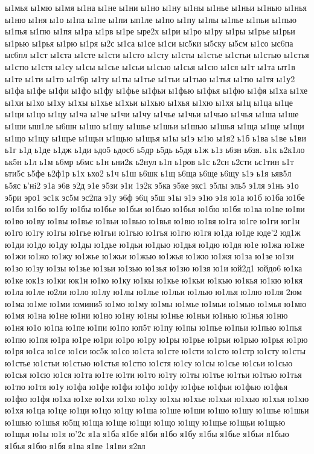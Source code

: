 {{ы1мья
ы1мю
ы1мя
ы1на
ы1не
ы1ни
ы1но
ы1ну
ы1ны
ы1нье
ы1ньи
ы1нью
ы1нья
ы1ню
ы1ня
ы1о
ы1па
ы1пе
ы1пи
ып1ле
ы1по
ы1пу
ы1пы
ы1пье
ы1пьи
ы1пью
ы1пья
ы1пю
ы1пя
ы1ра
ы1рв
ы1ре
ыре2х
ы1ри
ы1ро
ы1ру
ы1ры
ы1рье
ы1рьи
ы1рью
ы1рья
ы1рю
ы1ря
ы2с
ы1са
ы1се
ы1си
ыс5ки
ы5ску
ы5см
ы1со
ыс6па
ыс6пл
ы1ст
ы1ста
ы1сте
ы1сти
ы1сто
ы1сту
ы1сты
ы1стье
ы1стьи
ы1стью
ы1стья
ы1стю
ы1стя
ы1су
ы1сы
ы1сье
ы1сьи
ы1сью
ы1сья
ы1сю
ы1ся
ы1т
ы1та
ыт1в
ы1те
ы1ти
ы1то
ы1т6р
ы1ту
ы1ты
ы1тье
ы1тьи
ы1тью
ы1тья
ы1тю
ы1тя
ы1у2
ы1фа
ы1фе
ы1фи
ы1фо
ы1фу
ы1фье
ы1фьи
ы1фью
ы1фья
ы1фю
ы1фя
ы1ха
ы1хе
ы1хи
ы1хо
ы1ху
ы1хы
ы1хье
ы1хьи
ы1хью
ы1хья
ы1хю
ы1хя
ы1ц
ы1ца
ы1це
ы1ци
ы1цо
ы1цу
ы1ча
ы1че
ы1чи
ы1чу
ы1чье
ы1чьи
ы1чью
ы1чья
ы1ша
ы1ше
ы1ши
ыш1ле
ы6шн
ы1шо
ы1шу
ы1шье
ы1шьи
ы1шью
ы1шья
ы1ща
ы1ще
ы1щи
ы1що
ы1щу
ы1щье
ы1щьи
ы1щью
ы1щья
ы1ы
ы1э
ы1ю
ы1я2
ь1б
ь1ва
ь1ве
ь1ви
ь1г
ь1д
ь1де
ь1дж
ь1ди
ьдо5
ьдос6
ь5др
ь5дь
ь5дя
ь1ж
ь1з
ь6зн
ь6зя.
ь1к
ь2к1ло
ьк5н
ь1л
ь1м
ь6мр
ь6мс
ь1н
ьни2к
ь2нул
ь1п
ь1ров
ь1с
ь2сн
ь2сти
ьс1тин
ь1т
ьти5с
ь5фе
ь2ф1р
ь1х
ьхо2
ь1ч
ь1ш
ь6шк
ь1щ
ь6ща
ь6ще
ь6щу
ь1э
ь1я
ьяв5л
ь5яс
ь'нi2
э1а
э6в
э2д
э1е
э5зи
э1и
1э2к
э5ка
э5ке
экс1
э5лы
эль5
э1ля
э1нь
э1о
э5ри
эро1
эс1к
эс5м
эс2па
э1у
э6ф
э6ц
э5ш
э1ы
э1э
э1ю
э1я
ю1а
ю1б
ю1ба
ю1бе
ю1би
ю1бо
ю1бу
ю1бы
ю1бье
ю1бьи
ю1бью
ю1бья
ю1бю
ю1бя
ю1ва
ю1ве
ю1ви
ю1во
ю1ву
ю1вы
ю1вье
ю1вьи
ю1вью
ю1вья
ю1вю
ю1вя
ю1га
ю1ге
ю1ги
юг1н
ю1го
ю1гу
ю1гы
ю1гье
ю1гьи
ю1гью
ю1гья
ю1гю
ю1гя
ю1да
ю1де
юде'2
юд1ж
ю1ди
ю1до
ю1ду
ю1ды
ю1дье
ю1дьи
ю1дью
ю1дья
ю1дю
ю1дя
ю1е
ю1жа
ю1же
ю1жи
ю1жо
ю1жу
ю1жье
ю1жьи
ю1жью
ю1жья
ю1жю
ю1жя
ю1за
ю1зе
ю1зи
ю1зо
ю1зу
ю1зы
ю1зье
ю1зьи
ю1зью
ю1зья
ю1зю
ю1зя
ю1и
юй2д1
юйдо6
ю1ка
ю1ке
юк1з
ю1ки
юк1н
ю1ко
ю1ку
ю1кы
ю1кье
ю1кьи
ю1кью
ю1кья
ю1кю
ю1кя
ю1ла
ю1ле
ю2ли
ю1ло
ю1лу
ю1лы
ю1лье
ю1льи
ю1лью
ю1лья
ю1лю
ю1ля
2юм
ю1ма
ю1ме
ю1ми
юмини5
ю1мо
ю1му
ю1мы
ю1мье
ю1мьи
ю1мью
ю1мья
ю1мю
ю1мя
ю1на
ю1не
ю1ни
ю1но
ю1ну
ю1ны
ю1нье
ю1ньи
ю1нью
ю1нья
ю1ню
ю1ня
ю1о
ю1па
ю1пе
ю1пи
ю1по
юп5т
ю1пу
ю1пы
ю1пье
ю1пьи
ю1пью
ю1пья
ю1пю
ю1пя
ю1ра
ю1ре
ю1ри
ю1ро
ю1ру
ю1ры
ю1рье
ю1рьи
ю1рью
ю1рья
ю1рю
ю1ря
ю1са
ю1се
ю1си
юс5к
ю1со
ю1ста
ю1сте
ю1сти
ю1сто
ю1стр
ю1сту
ю1сты
ю1стье
ю1стьи
ю1стью
ю1стья
ю1стю
ю1стя
ю1су
ю1сы
ю1сье
ю1сьи
ю1сью
ю1сья
ю1сю
ю1ся
ю1та
ю1те
ю1ти
ю1то
ю1ту
ю1ты
ю1тье
ю1тьи
ю1тью
ю1тья
ю1тю
ю1тя
ю1у
ю1фа
ю1фе
ю1фи
ю1фо
ю1фу
ю1фье
ю1фьи
ю1фью
ю1фья
ю1фю
ю1фя
ю1ха
ю1хе
ю1хи
ю1хо
ю1ху
ю1хы
ю1хье
ю1хьи
ю1хью
ю1хья
ю1хю
ю1хя
ю1ца
ю1це
ю1ци
ю1цо
ю1цу
ю1ша
ю1ше
ю1ши
ю1шо
ю1шу
ю1шье
ю1шьи
ю1шью
ю1шья
ю5щ
ю1ща
ю1ще
ю1щи
ю1що
ю1щу
ю1щье
ю1щьи
ю1щью
ю1щья
ю1ы
ю1я
ю'2с
я1а
я1ба
я1бе
я1би
я1бо
я1бу
я1бы
я1бье
я1бьи
я1бью
я1бья
я1бю
я1бя
я1ва
я1ве
1я1ви
я2вл
}}
